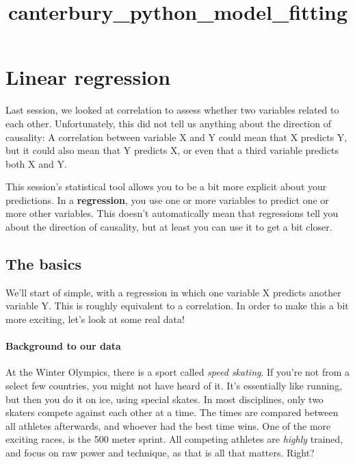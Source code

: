 \documentclass[11pt]{article}
\title{canterbury\_python\_model\_fitting}
\begin{document}
    
    
    \maketitle
    
    

    
    \section{Linear regression}\label{linear-regression}

Last session, we looked at correlation to assess whether two variables
related to each other. Unfortunately, this did not tell us anything
about the direction of causality: A correlation between variable X and Y
could mean that X predicts Y, but it could also mean that Y predicts X,
or even that a third variable predicts both X and Y.

This session's statistical tool allows you to be a bit more explicit
about your predictions. In a \textbf{regression}, you use one or more
variables to predict one or more other variables. This doesn't
automatically mean that regressions tell you about the direction of
causality, but at least you can use it to get a bit closer.

    \subsection{The basics}\label{the-basics}

We'll start of simple, with a regression in which one variable X
predicts another variable Y. This is roughly equivalent to a
correlation. In order to make this a bit more exciting, let's look at
some real data!

\paragraph{Background to our data}\label{background-to-our-data}

At the Winter Olympics, there is a sport called \emph{speed skating}. If
you're not from a select few countries, you might not have heard of it.
It's essentially like running, but then you do it on ice, using special
skates. In most disciplines, only two skaters compete against each other
at a time. The times are compared between all athletes afterwards, and
whoever had the best time wins. One of the more exciting races, is the
500 meter sprint. All competing athletes are \emph{highly} trained, and
focus on raw power and technique, as that is all that matters. Right?
\end{document}
